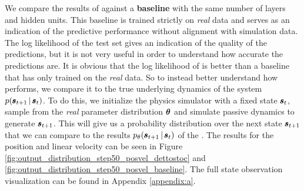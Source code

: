 We compare the results of \dettostoc{} against a \textbf{baseline} \cvae{} with the same number of layers and hidden units. This baseline \cvae{} is trained strictly on \emph{real} data and serves as an indication of the predictive performance without alignment with simulation data.
The log likelihood of the test set gives an indication of the quality of the predictions, but it is not very useful in order to understand how accurate the predictions are. It is obvious that the log likelihood of \dettostoc{} is better than a \cvae{} baseline that has only trained on the \emph{real} data. So to instead better understand how \dettostoc{} performs, we compare it to the true underlying dynamics of the system $p \given{\vns}{\vs}$. To do this, we initialize the physics simulator with a fixed state $\pmb{s}_t$, sample from the \emph{real} parameter distribution $\boldsymbol{\theta}$ and simulate passive dynamics to generate $\pmb{s}_{t+1}$. This will give us a probability distribution over the next state $\pmb{s}_{t+1}$ that we can compare to the results $\ptheta \given{\vns}{\vs}$ of the \cvae{}. The results for the position and linear velocity can be seen in Figure \ref{fig:output_distribution_step50_posvel_dettostoc} and \ref{fig:output_distribution_step50_posvel_baseline}. The full state observation visualization can be found in Appendix \ref{appendix:a}.

